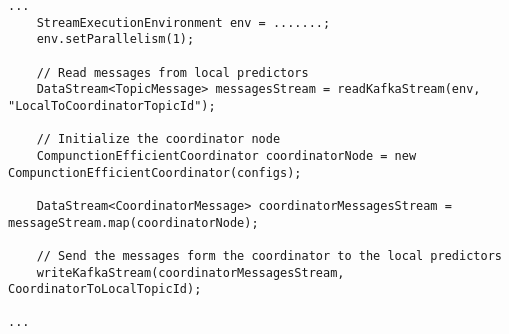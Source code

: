 \begin{lstlisting}[caption={The coordinator Flink program.},label={algonline:flink2},frame=single]
...
	StreamExecutionEnvironment env = .......;
	env.setParallelism(1);
 
	// Read messages from local predictors
	DataStream<TopicMessage> messagesStream = readKafkaStream(env, "LocalToCoordinatorTopicId");
	
	// Initialize the coordinator node
	CompunctionEfficientCoordinator coordinatorNode = new CompunctionEfficientCoordinator(configs);
	
	DataStream<CoordinatorMessage> coordinatorMessagesStream = messageStream.map(coordinatorNode);
	
	// Send the messages form the coordinator to the local predictors
	writeKafkaStream(coordinatorMessagesStream, CoordinatorToLocalTopicId);

...
\end{lstlisting}

                 